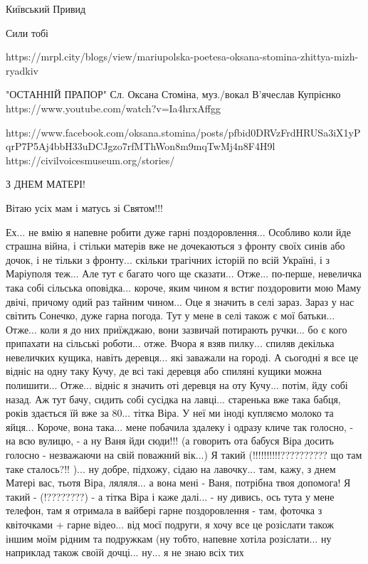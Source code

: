 Київський Привид

Сили тобі

https://mrpl.city/blogs/view/mariupolska-poetesa-oksana-stomina-zhittya-mizh-ryadkiv

"ОСТАННІЙ ПРАПОР" Сл. Оксана Стоміна, муз./вокал В'ячеслав Купрієнко
https://www.youtube.com/watch?v=Ia4hrxAffgg

https://www.facebook.com/oksana.stomina/posts/pfbid0DRVzFrdHRUSa3iX1yPqrP7P5Aj4bbH33uDCJgzo7rfMThWon8m9mqTwMj4n8F4H9l
https://civilvoicesmuseum.org/stories/%

З ДНЕМ МАТЕРІ!

Вітаю усіх мам і матусь зі Святом!!!

Ех... не вмію я напевне робити дуже гарні поздоровлення... Особливо коли йде
страшна війна, і стільки матерів вже не дочекаються з фронту своїх синів або
дочок, і не тільки з фронту... скільки трагічних історій по всій Україні, і з
Маріуполя теж...  Але тут є багато чого ще сказати...  Отже... по-перше,
невеличка така собі сільська оповідка...  короче, яким чином я встиг
поздоровити мою Маму двічі, причому одий раз тайним чином... Оце я значить в
селі зараз. Зараз у нас світить Сонечко, дуже гарна погода. Тут у мене в селі
також є мої батьки...  Отже... коли я до них приїжджаю, вони зазвичай потирають
ручки... бо є кого припахати на сільські роботи... отже. Вчора я взяв пилку...
спиляв декілька невеличких кущика, навіть деревця... які заважали на городі. А
сьогодні я все це відніс на одну таку Кучу, де всі такі деревця або спиляні
кущики можна полишити...  Отже... відніс я значить оті деревця на оту Кучу...
потім, йду собі назад. Аж тут бачу, сидить собі сусідка на лавці... старенька
вже така бабця, років здається їй вже за 80... тітка Віра. У неї ми іноді
купляємо молоко та яйця... Короче, вона така... мене побачила здалеку і одразу
кличе так голосно, - на всю вулицю, - а ну Ваня йди сюди!!! (а говорить ота
бабуся Віра досить голосно - незважаючи на свій поважний вік...) Я такий
(!!!!!!!!!!?????????? що там таке сталось?!! )...  ну добре, підхожу, сідаю на
лавочку... там, кажу, з днем Матері вас, тьотя Віра, ляляля... а вона мені -
Ваня, потрібна твоя допомога! Я такий - (!????????) - а тітка Віра і каже
далі... - ну дивись, ось тута у мене телефон, там я отримала в вайбері гарне
поздоровлення - там, фоточка з квіточками + гарне відео... від моєї подруги, я
хочу все це розіслати також іншим моїм рідним та подружкам (ну тобто, напевне
хотіла розіслати... ну наприклад також своїй дочці... ну... я не знаю всіх тих
